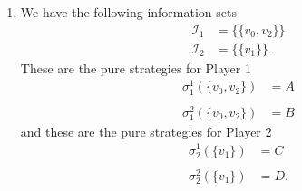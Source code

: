 \documentclass[a4paper]{article}
\begin{document}
\begin{exercise}{3}
\begin{enumerate}[label=(\alph*)]
\begin{enumerate}[label=(\roman*)]
        \item We have the following information sets
          \begin{align*}
            \mathcal{I}_1 &= \{\{v_0, v_2\}\} \\
            \mathcal{I}_2 &= \{\{v_1\}\}.
          \end{align*}
          These are the pure strategies for Player 1
          \begin{align*}
            \sigma_1^{1}(\{v_0, v_2\}) &= A \\
            \\
            \sigma_1^{2}(\{v_0, v_2\}) &= B
          \end{align*}
          and these are the pure strategies for Player 2
          \begin{align*}
            \sigma_2^{1}(\{v_1\}) &= C \\
            \\
            \sigma_2^{2}(\{v_1\}) &= D
          .\end{align*}


\end{enumerate}
\end{enumerate}
\end{exercise}
\end{document}
